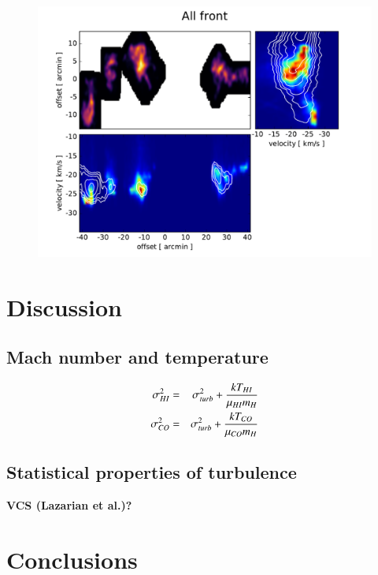 \documentclass[traditabstract]{aa}
\begin{document}
\begin{figure}[h]
  \centering
  \includegraphics[page=2,width=\linewidth,trim=30 10 55 30,clip=true]{Figures/PV_diagrams_CO.pdf}
  \caption{}
\end{figure}



\section{Discussion}
\label{sec:discussion}

   \subsection{Mach number and temperature}

\textbf{
\begin{eqnarray}
  \sigma_{H\rmnum{1}}^2 &=& \sigma_{turb}^2+\frac{k T_{H\rmnum{1}}}{\mu_{H\rmnum{1}} m_H} \\
  \sigma_{CO}^2         &=& \sigma_{turb}^2+\frac{k T_{CO}}{\mu_{CO} m_H}
\end{eqnarray}
}


   \subsection{Statistical properties of turbulence}

\textbf{VCS (Lazarian et al.)?}




\section{Conclusions}
\label{sec:conclusion}
\end{document}
